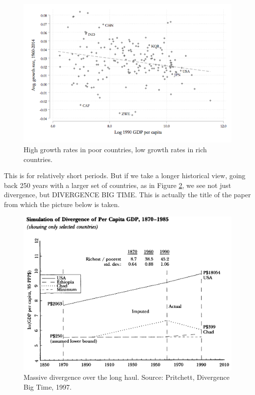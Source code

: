 \documentclass[
]{book}
\begin{document}
\begin{figure}

{\centering \includegraphics[width=1\linewidth]{img/ch1/growth9} 

}

\caption{High growth rates in poor countries, low growth rates in rich countries.}\label{fig:fig109}
\end{figure}

This is for relatively short periods. But if we take a longer historical view, going back 250 years with a larger set of countries, as in Figure \ref{fig:fig110}, we see not just divergence, but DIVERGENCE BIG TIME. This is actually the title of the paper from which the picture below is taken.

\begin{figure}

{\centering \includegraphics[width=1\linewidth]{img/ch1/growth10} 

}

\caption{Massive divergence over the long haul. Source: Pritchett, Divergence Big Time, 1997.}\label{fig:fig110}
\end{figure}
\end{document}
